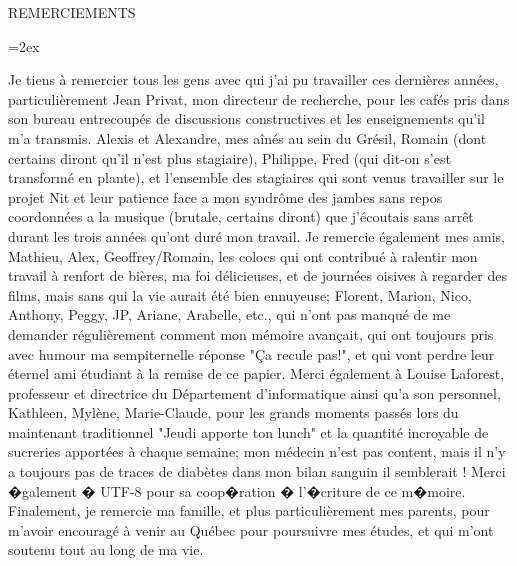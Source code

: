    \parskip=0pt
   \vspace*{0.1 truecm} 
   \begin{center}
    {\uppercase { REMERCIEMENTS }}\par
   \end{center}
   \nobreak \vspace*{1.10 truecm}
   \parskip=2ex

Je tiens à remercier tous les gens avec qui j'ai pu travailler ces dernières années, particulièrement Jean Privat, mon directeur de recherche, pour les cafés pris dans son bureau entrecoupés de discussions constructives et les enseignements qu'il m'a transmis.
Alexis et Alexandre, mes aînés au sein du Grésil, Romain (dont certains diront qu'il n'est plus stagiaire), Philippe, Fred (qui dit-on s'est transformé en plante), et l'ensemble des stagiaires qui sont venus travailler sur le projet Nit et leur patience face a mon syndrôme des jambes sans repos coordonnées a la musique (brutale, certains diront) que j'écoutais sans arrêt durant les trois années qu'ont duré mon travail.
Je remercie également mes amis, Mathieu, Alex, Geoffrey/Romain, les colocs qui ont contribué à ralentir mon travail à renfort de bières, ma foi délicieuses, et de journées oisives à regarder des films, mais sans qui la vie aurait été bien ennuyeuse; Florent, Marion, Nico, Anthony, Peggy, JP, Ariane, Arabelle, etc., qui n'ont pas manqué de me demander régulièrement comment mon mémoire avançait, qui ont toujours pris avec humour ma sempiternelle réponse "Ça recule pas!", et qui vont perdre leur éternel ami étudiant à la remise de ce papier.
Merci également à Louise Laforest, professeur et directrice du Département d'informatique ainsi qu'a son personnel, Kathleen, Mylène, Marie-Claude, pour les grands moments passés lors du maintenant traditionnel "Jeudi apporte ton lunch" et la quantité incroyable de sucreries apportées à chaque semaine; mon médecin n'est pas content, mais il n'y a toujours pas de traces de diabètes dans mon bilan sanguin il semblerait !
Merci {�}galement {�} UTF-8 pour sa coop{�}ration {�} l'{�}criture de ce m{�}moire.
Finalement, je remercie ma famille, et plus particulièrement mes parents, pour m'avoir encouragé à venir au Québec pour poursuivre mes études, et qui m'ont soutenu tout au long de ma vie.
